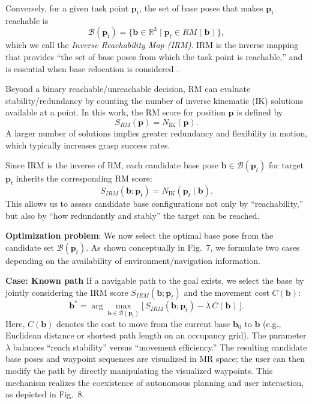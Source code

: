 \documentclass[../../main.tex]{subfiles} %
\begin{document}
Conversely, for a given task point $\mathbf{p}_t$, the set of base poses that makes $\mathbf{p}_t$ reachable is
\begin{equation}
\mathcal{B}(\mathbf{p}_t) = \{ \mathbf{b} \in \mathbb{R}^3 \mid \mathbf{p}_t \in RM(\mathbf{b}) \},
\end{equation}
which we call the \textit{Inverse Reachability Map (IRM)}.  
IRM is the inverse mapping that provides “the set of base poses from which the task point is reachable,” 
and is essential when base relocation is considered \cite{ref6}.

Beyond a binary reachable/unreachable decision, RM can evaluate stability/redundancy 
by counting the number 
of inverse kinematic (IK) solutions available at a point.  
In this work, the RM score for position $\mathbf{p}$ is defined by
\begin{equation}
S_{RM}(\mathbf{p}) = N_{\text{IK}}(\mathbf{p}).
\end{equation}
A larger number of solutions implies greater redundancy and flexibility in motion, 
which typically increases grasp success rates.

Since IRM is the inverse of RM, each candidate base pose $\mathbf{b}\in\mathcal{B}(\mathbf{p}_t)$ 
for target $\mathbf{p}_t$ inherits the corresponding RM score:
\begin{equation}
S_{IRM}(\mathbf{b}; \mathbf{p}_t) = N_{\text{IK}}(\mathbf{p}_t \mid \mathbf{b}).
\end{equation}
This allows us to assess candidate base configurations not only by “reachability,” 
but also by “how redundantly and stably” the target can be reached.

\medskip
\textbf{Optimization problem}:  
We now select the optimal base pose from the candidate set $\mathcal{B}(\mathbf{p}_t)$.  
As shown conceptually in Fig.~7, we formulate two cases depending on the availability of 
environment/navigation information.

\medskip
\textbf{Case: Known path}  
If a navigable path to the goal exists, we select the base by jointly considering 
the IRM score $S_{IRM}(\mathbf{b}; \mathbf{p}_t)$ and the movement cost $C(\mathbf{b})$:
\begin{equation}
\mathbf{b}^* = \arg\max_{\mathbf{b} \in \mathcal{B}(\mathbf{p}_t)}
\Big[\, S_{IRM}(\mathbf{b}; \mathbf{p}_t) - \lambda\, C(\mathbf{b}) \,\Big].
\end{equation}
Here, $C(\mathbf{b})$ denotes the cost to move from the current base $\mathbf{b}_0$ 
to $\mathbf{b}$ (e.g., Euclidean distance or shortest path length on an occupancy grid).  
The parameter $\lambda$ balances “reach stability” versus “movement efficiency.”  
The resulting candidate base poses and waypoint sequences are visualized in MR space; 
the user can then modify the path by directly manipulating the visualized waypoints.  
This mechanism realizes the coexistence of autonomous planning and user interaction, as depicted in Fig.~8.
\end{document}

